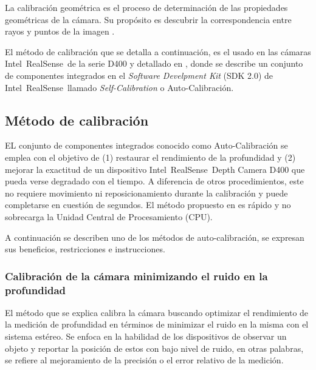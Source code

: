 \begin{definition}
	La calibración geométrica es el proceso de determinación de las propiedades geométricas de la cámara. Su propósito es descubrir la correspondencia entre rayos y puntos de la imagen \cite{kannala2008geometric}.
\end{definition}

El método de calibración que se detalla a continuación, es el usado en las cámaras Intel\textregistered~RealSense\texttrademark~de la serie D400 y detallado en \cite{grunnet2021intel}, donde se describe un conjunto de componentes integrados en el \textit{Software Develpment Kit} (SDK 2.0) de Intel\textregistered~RealSense\texttrademark~llamado \textit{Self-Calibration} o Auto-Calibración. 

\subsection{Método de calibración}

EL conjunto de componentes integrados conocido como Auto-Calibración se emplea con el objetivo de (1) restaurar el rendimiento de la profundidad y (2) mejorar la exactitud de un dispositivo Intel\textregistered~RealSense\texttrademark~Depth Camera D400 que pueda verse degradado con el tiempo. A diferencia de otros procedimientos, este no requiere movimiento ni reposicionamiento durante la calibración y puede completarse en cuestión de segundos. El método propuesto en \cite{grunnet2021intel} es rápido y no sobrecarga la Unidad Central de Procesamiento (CPU).

A continuación se describen uno de los métodos de auto-calibración, se expresan sus beneficios, restricciones e instrucciones.

\subsubsection{Calibración de la cámara minimizando el ruido en la profundidad}

El método que se explica calibra la cámara buscando optimizar el rendimiento de la medición de profundidad en términos de minimizar el ruido en la misma con el sistema estéreo. Se enfoca en la habilidad de los dispositivos de observar un objeto y reportar la posición de estos con bajo nivel de ruido, en otras palabras, se refiere al mejoramiento de la precisión o el error relativo de la medición.

